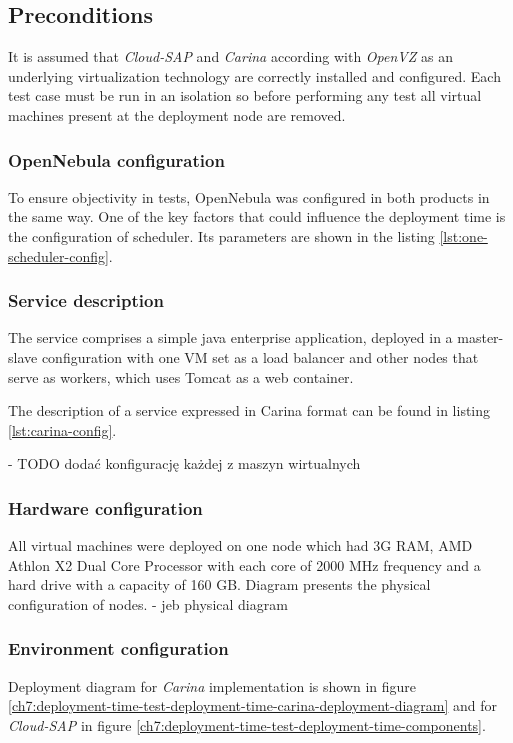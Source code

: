 \subsection*{Preconditions}
It is assumed that \emph{Cloud-SAP} and \emph{Carina} according with \emph{OpenVZ} as an underlying virtualization technology are correctly installed and configured.
Each test case must be run in an isolation so before performing any test all virtual machines present at the deployment node are removed.
\subsubsection{OpenNebula configuration}
To ensure objectivity in tests, OpenNebula was configured in both products in the same way. One of the key factors that could influence the deployment time is the configuration of scheduler. Its parameters are shown in the listing \ref{lst:one-scheduler-config}.

\subsubsection{Service description}
The service comprises a simple java enterprise application, deployed in a master-slave configuration with one VM set as a load balancer and other nodes that serve as workers, which uses Tomcat as a web container.

The description of a service expressed in Carina format can be found in listing \ref{lst:carina-config}.

- TODO dodać konfigurację każdej z maszyn wirtualnych

\subsubsection{Hardware configuration}
All virtual machines were deployed on one node which had 3G RAM, AMD Athlon X2 Dual Core Processor with each core of 2000 MHz frequency and a hard drive with a capacity of 160 GB. Diagram presents the physical configuration of nodes.
- jeb physical diagram

\subsubsection{Environment configuration}
Deployment diagram for \emph{Carina} implementation is shown in figure \ref{ch7:deployment-time-test-deployment-time-carina-deployment-diagram} and for \emph{Cloud-SAP} in figure \ref{ch7:deployment-time-test-deployment-time-components}.

